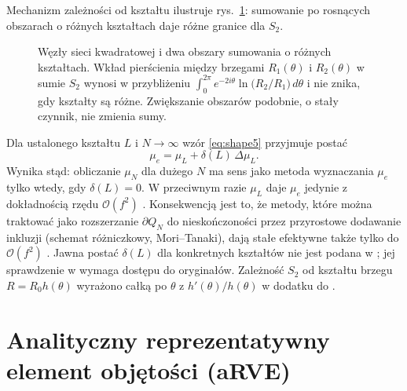 \documentclass[12pt,a4paper,twoside,openright]{report}
\theoremstyle{definition}
\theoremstyle{remark}
\begin{document}
Mechanizm zależności od kształtu ilustruje rys.~\ref{fig:shapes}: sumowanie po rosnących obszarach o różnych kształtach daje różne granice dla $S_2$.

\begin{figure}[htbp]
\centering
{}
\caption{Węzły sieci kwadratowej i dwa obszary sumowania o różnych kształtach. Wkład pierścienia między brzegami $R_1(\theta)$ i $R_2(\theta)$ w sumie $S_2$ wynosi w przybliżeniu $\int_0^{2\pi}e^{-2i\theta}\ln\bigl(R_2/R_1\bigr)\,d\theta$ i nie znika, gdy kształty są różne. Zwiększanie obszarów podobnie, o stały czynnik, nie zmienia sumy.}\label{fig:shapes}
\end{figure}
Dla ustalonego kształtu $L$ i $N\to\infty$ wzór \eqref{eq:shape5} przyjmuje postać
\begin{equation}\label{eq:shape6}
\mu_e=\mu_L+\delta(L)\,\Delta\mu_L .
\end{equation}
Wynika stąd: obliczanie $\mu_N$ dla dużego $N$ ma sens jako metoda wyznaczania $\mu_e$ tylko wtedy, gdy $\delta(L)=0$. W przeciwnym razie $\mu_L$ daje $\mu_e$ jedynie z dokładnością rzędu $\mathcal O(f^2)$ \cite{czapla2025computational}. Konsekwencją jest to, że metody, które można traktować jako rozszerzanie $\partial Q_N$ do nieskończoności przez przyrostowe dodawanie inkluzji (schemat różniczkowy, Mori--Tanaki), dają stałe efektywne także tylko do $\mathcal O(f^2)$ \cite{czapla2025computational,mityushev2022effective1}. Jawna postać $\delta(L)$ dla konkretnych kształtów nie jest podana w \cite{czapla2025computational,mityushev2025computationalpart3}; jej sprawdzenie w \cite{rayleigh1892lvi,mcphedran1978conductivity,mckenzie1978conductivity} wymaga dostępu do oryginałów. Zależność $S_2$ od kształtu brzegu $R=R_0h(\theta)$ wyrażono całką po $\theta$ z $h'(\theta)/h(\theta)$ w dodatku do \cite{mityushev1997transport}.

\section{Analityczny reprezentatywny element objętości (aRVE)}
\end{document}
